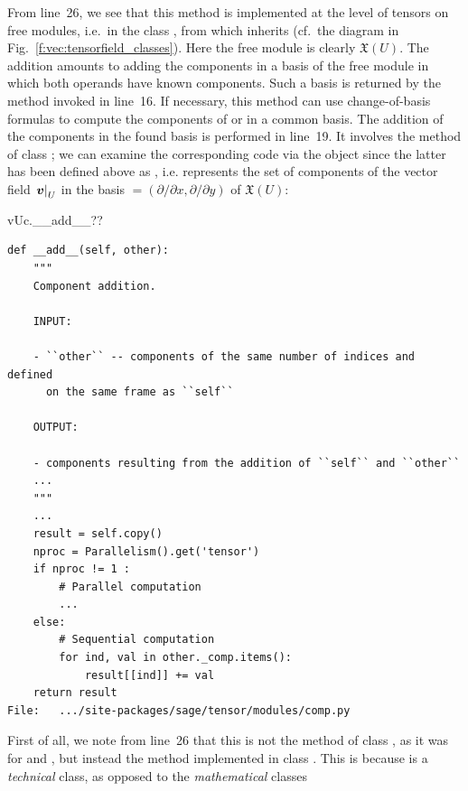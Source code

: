 From line~26, we see that this method  is implemented
at the level of tensors on free modules, i.e.\ in the class
,
from which  inherits (cf.\ the diagram in
Fig.~\ref{f:vec:tensorfield_classes}). Here the free module is clearly
$\mathfrak{X}(U)$. The addition amounts to adding the components in a
basis of the free module in which both operands have known components. Such
a basis is returned by the method  invoked in line~16.
If necessary, this method can use change-of-basis formulas to compute the
components of  or  in a common basis.
The addition of the components in the found basis is performed in line~19. It
involves the method  of class ; we
can examine the corresponding code via the object  since the
latter has been defined above as , i.e.
 represents the set of components of the vector field
$\left. \bm{v}\right| _U$ in the basis  $=(\partial/\partial x, \partial/\partial y)$
of $\mathfrak{X}(U)$:
\begin{NBin}
vUc.__add__??
\end{NBin}
\begin{lstlisting}
def __add__(self, other):
    """
    Component addition.

    INPUT:

    - ``other`` -- components of the same number of indices and defined
      on the same frame as ``self``

    OUTPUT:

    - components resulting from the addition of ``self`` and ``other``
    ...
    """
    ...
    result = self.copy()
    nproc = Parallelism().get('tensor')
    if nproc != 1 :
        # Parallel computation
        ...
    else:
        # Sequential computation
        for ind, val in other._comp.items():
            result[[ind]] += val
    return result
File:   .../site-packages/sage/tensor/modules/comp.py
\end{lstlisting}
First of all, we note from line~26
that this is not the method  of class ,
as it was for  and ,
but instead the method  implemented
in class . This is because  is a
\emph{technical} class, as opposed to the \emph{mathematical} classes
